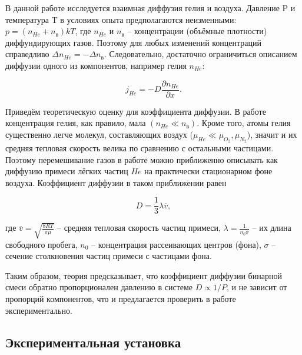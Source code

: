 \documentclass[a4paper,12pt]{article}
\theoremstyle{definition}
\begin{document}
В данной работе исследуется взаимная диффузия гелия и воздуха. Давление P и температура T в условиях опыта предполагаются неизменными: $ p=(n_{He}+n_{\text{в}})kT $, где $ n_{He} $ и $ n_{\text{в}} $ -- концентрации (объёмные плотности) диффундирующих газов. Поэтому для любых изменений концентраций справедливо $ \Delta n_{He}=-\Delta n_{\text{в}} $. Следовательно, достаточно ограничиться описанием диффузии одного из компонентов, например гелия $ n_{He} $:

\begin{equation}\label{1}
	j_{He}=-D\dfrac{\partial 	n_{He}}{\partial x}.
\end{equation}

Приведём теоретическую оценку для коэффициента диффузии. В работе концентрация гелия, как правило, мала $ (n_{He} \ll n_\text{в}) $. Кроме того, атомы гелия существенно легче молекул, составляющих воздух ($ \mu_{He} \ll \mu_{O_2}, \mu_{N_2} $), значит и их средняя тепловая скорость велика по сравнению с остальными частицами. Поэтому перемешивание газов в работе можно приближенно описывать как диффузию примеси лёгких частиц $ He $ на практически стационарном фоне воздуха. Коэффициент диффузии в таком приближении равен

\begin{equation}\label{2}
	D=\dfrac{1}{3}\lambda 	\overline{v},
\end{equation}

где $ \overline{v}=\sqrt{\frac{8RT}{\pi \mu}} $ -- средняя тепловая скорость частиц примеси, $ \lambda = \frac{1}{n_0\sigma} $ -- их длина свободного пробега, $ n_0 $ -- концентрация рассеивающих центров (фона), $ \sigma $ -- сечение столкновения частиц примеси с частицами фона.

Таким образом, теория предсказывает, что коэффициент диффузии бинарной смеси обратно пропорционален давлению в системе $ D \propto 1/P $, и не зависит от пропорций компонентов, что и предлагается проверить в работе экспериментально.

\subsection{Экспериментальная установка}
\end{document}
